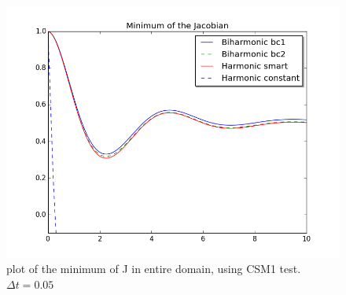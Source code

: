 \begin{figure}[H]
  \label{fig:fluid_structure}
  \includegraphics[scale=0.60, trim={0mm 0mm 0mm 0mm},clip]{./Mesh_motion_results/CSM1.png}
   \caption{plot of the minimum of J in entire domain, using CSM1 test. $\Delta t = 0.05$}
\end{figure}

